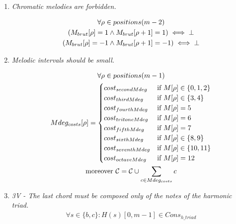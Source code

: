\begin{enumerate}[wide, label=\bfseries G\arabic*]
    \item \textit{Chromatic melodies are forbidden.}\label{rule:chromafb}

    \begin{equation}
        \begin{gathered}
            \forall \rho \in positions(m-2)\\
            (M_{brut}[\rho] = 1 \land M_{brut}[\rho+1] = 1) \iff \bot\\
            (M_{brut}[\rho] = -1 \land M_{brut}[\rho+1] = -1) \iff \bot\\
        \end{gathered}
    \end{equation}
    
    \item \textit{Melodic intervals should be small.}\label{rule:smallmelody}

    \begin{equation}\label{eq:mdeg_costs}
        \begin{gathered}
            \forall \rho \in positions(m-1)\\
            Mdeg_{costs}[\rho] = \begin{cases}
                cost_{secondMdeg} & \text{if } M[\rho] \in \{0, 1, 2\}\\
                cost_{thirdMdeg} & \text{if } M[\rho] \in \{3, 4\}\\
                cost_{fourthMdeg} & \text{if } M[\rho] = 5\\
                cost_{tritoneMdeg} & \text{if } M[\rho] = 6\\
                cost_{fifthMdeg} & \text{if } M[\rho] = 7\\
                cost_{sixthMdeg} & \text{if } M[\rho] \in \{8, 9\}\\
                cost_{seventhMdeg} & \text{if } M[\rho] \in \{10, 11\}\\
                cost_{octaveMdeg} & \text{if } M[\rho] = 12\\
            \end{cases}\\
            \text{moreover } \mathcal{C} = \mathcal{C} \cup \sum _{c \in Mdeg_{costs}} c
        \end{gathered}
    \end{equation}

    \item\label{rule:last-chord-h-triad-appendix} \textit{3V - The last chord must be composed only of the notes of the harmonic triad.} 
\begin{equation} \begin{aligned}
    \forall s \in \{b, c\} \colon H(s)[0, m-1] \in Cons_{h\_triad}
\end{aligned} \end{equation}


\end{enumerate}
